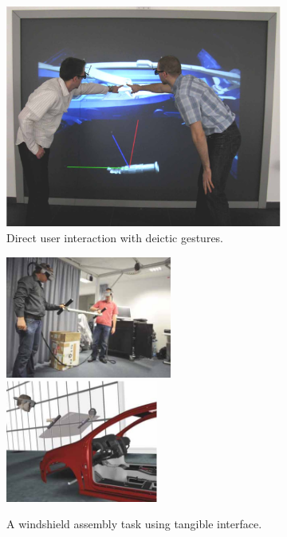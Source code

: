 \begin{figure}[htb]
  \begin{subfigure}{.3\textwidth}
    \centering
    \includegraphics[width=\linewidth]{figures/ch2/pointing}
    \caption{Direct user interaction with deictic gestures.}
    \label{fig:2_consistent_collab:pointing}
  \end{subfigure}
  \begin{subfigure}{.7\textwidth}
    \centering
    \includegraphics[height=4cm]{figures/ch2/tangible_1}
    \includegraphics[height=4cm]{figures/ch2/tangible_2}
    \caption{A windshield assembly task using tangible interface.}
    \label{fig:2_consistent_collab:tangible}
  \end{subfigure}
  \begin{subfigure}{.45\textwidth}

\end{subfigure}
\end{figure}

